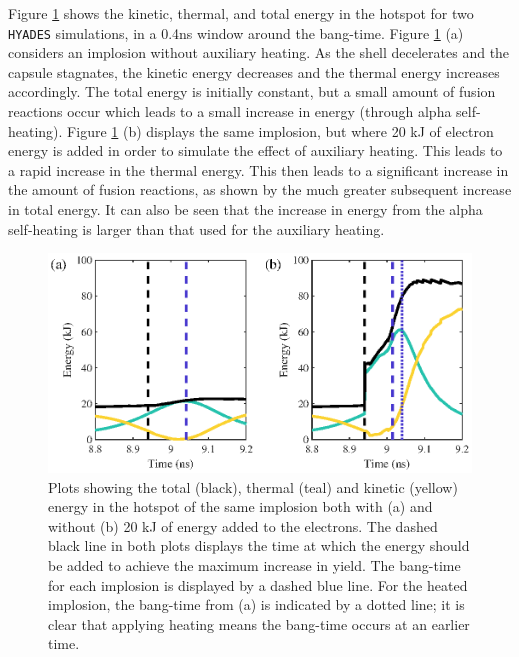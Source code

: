 Figure \ref{fig:EnergyDist} shows the kinetic, thermal, and total energy in the hotspot for two \texttt{HYADES} simulations, in a 0.4ns window around the bang-time. Figure \ref{fig:EnergyDist} (a) considers an implosion without auxiliary heating. As the shell decelerates and the capsule stagnates, the kinetic energy decreases and the thermal energy increases accordingly. The total energy is initially constant, but a small amount of fusion reactions occur which leads to a small increase in energy (through alpha self-heating). Figure \ref{fig:EnergyDist} (b) displays the same implosion, but where 20 kJ of electron energy is added in order to simulate the effect of auxiliary heating. This leads to a rapid increase in the thermal energy. This then leads to a significant increase in the amount of fusion reactions, as shown by the much greater subsequent increase in total energy. It can also be seen that the increase in energy from the alpha self-heating is larger than that used for the auxiliary heating.

\begin{figure}[ht]
\centering
\includegraphics{figures/FurtherSims/EnergyDist.eps}
\caption{Plots showing the total (black), thermal (teal) and kinetic (yellow) energy in the hotspot of the same implosion both with (a) and without (b) 20 kJ of energy added to the electrons. The dashed black line in both plots displays the time at which the energy should be added to achieve the maximum increase in yield. The bang-time for each implosion is displayed by a dashed blue line. For the heated implosion, the bang-time from (a) is indicated by a dotted line; it is clear that applying heating means the bang-time occurs at an earlier time.}
\label{fig:EnergyDist}
\end{figure}


